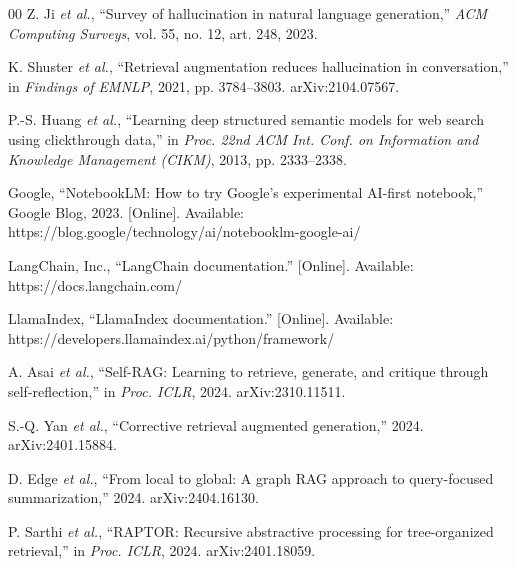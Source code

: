 \documentclass[conference]{IEEEtran}
\begin{document}
\begin{thebibliography}{00}
 Z. Ji \emph{et al.}, ``Survey of hallucination in natural language generation,'' \emph{ACM Computing Surveys}, vol. 55, no. 12, art. 248, 2023.

 K. Shuster \emph{et al.}, ``Retrieval augmentation reduces hallucination in conversation,'' in \emph{Findings of EMNLP}, 2021, pp. 3784--3803. arXiv:2104.07567.

 P.-S. Huang \emph{et al.}, ``Learning deep structured semantic models for web search using clickthrough data,'' in \emph{Proc. 22nd ACM Int. Conf. on Information and Knowledge Management (CIKM)}, 2013, pp. 2333--2338.

 Google, ``NotebookLM: How to try Google's experimental AI-first notebook,'' Google Blog, 2023. [Online]. Available: https://blog.google/technology/ai/notebooklm-google-ai/

 LangChain, Inc., ``LangChain documentation.'' [Online]. Available: https://docs.langchain.com/

 LlamaIndex, ``LlamaIndex documentation.'' [Online]. Available: https://developers.llamaindex.ai/python/framework/

 A. Asai \emph{et al.}, ``Self-RAG: Learning to retrieve, generate, and critique through self-reflection,'' in \emph{Proc. ICLR}, 2024. arXiv:2310.11511.

 S.-Q. Yan \emph{et al.}, ``Corrective retrieval augmented generation,'' 2024. arXiv:2401.15884.

 D. Edge \emph{et al.}, ``From local to global: A graph RAG approach to query-focused summarization,'' 2024. arXiv:2404.16130.

 P. Sarthi \emph{et al.}, ``RAPTOR: Recursive abstractive processing for tree-organized retrieval,'' in \emph{Proc. ICLR}, 2024. arXiv:2401.18059.

\end{thebibliography}
\end{document}

